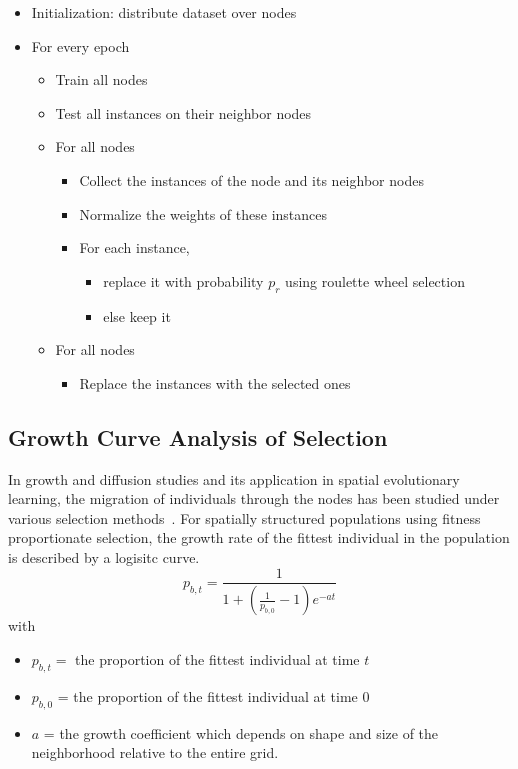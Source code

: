 \documentclass{llncs}
\begin{document}
\begin{itemize}
\item{} Initialization: distribute dataset over nodes
\item{} For every epoch
  \begin{itemize}
   \item{}Train all nodes
   \item{}Test all instances on their neighbor nodes
   \item{}For all nodes
   \begin{itemize}
      \item{}Collect the instances of the node and its neighbor nodes
      \item{}Normalize the weights of these instances
      \item{}For each instance, 
      \begin{itemize}
         \item{} replace it with probability $p_r$ using roulette wheel selection
         \item{} else keep it
      \end{itemize}
   \end{itemize}
   \item{} For all nodes
      \begin{itemize}
         \item{} Replace the instances with the selected ones
      \end{itemize}
  \end{itemize}
\end{itemize}


\subsection{Growth Curve Analysis of Selection}
In growth and diffusion studies and its application in spatial evolutionary learning, the migration of individuals through the nodes has been studied under various selection methods~\cite{Sarma96ananalysis,Banks}. For spatially structured populations using fitness proportionate selection, the growth rate of the fittest individual in the population is described by a logisitc curve. 
$$
p_{b,t} = \frac{1}{1+(\frac{1}{p_{b,0}}-1)e^{-at}}
$$
with \begin{itemize}
\item{}  $p_{b,t} = $ the proportion of the fittest individual at time $t$
\item{}  $p_{b,0}$  = the proportion of the fittest individual at time $0$
\item{} $a$ = the growth coefficient which depends on shape and size of the neighborhood relative to the entire grid.
\end{itemize}
\end{document}
